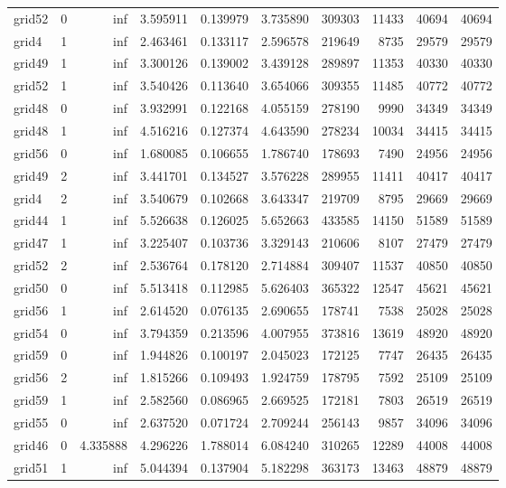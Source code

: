 \begin{longtable}{|l|r|r|r|r|r|r|r|r|r|}
grid52 & 0 & inf & 3.595911 & 0.139979 & 3.735890 & 309303 & 11433 & 40694 & 40694 \\
grid4 & 1 & inf & 2.463461 & 0.133117 & 2.596578 & 219649 & 8735 & 29579 & 29579 \\
grid49 & 1 & inf & 3.300126 & 0.139002 & 3.439128 & 289897 & 11353 & 40330 & 40330 \\
grid52 & 1 & inf & 3.540426 & 0.113640 & 3.654066 & 309355 & 11485 & 40772 & 40772 \\
grid48 & 0 & inf & 3.932991 & 0.122168 & 4.055159 & 278190 & 9990 & 34349 & 34349 \\
grid48 & 1 & inf & 4.516216 & 0.127374 & 4.643590 & 278234 & 10034 & 34415 & 34415 \\
grid56 & 0 & inf & 1.680085 & 0.106655 & 1.786740 & 178693 & 7490 & 24956 & 24956 \\
grid49 & 2 & inf & 3.441701 & 0.134527 & 3.576228 & 289955 & 11411 & 40417 & 40417 \\
grid4 & 2 & inf & 3.540679 & 0.102668 & 3.643347 & 219709 & 8795 & 29669 & 29669 \\
grid44 & 1 & inf & 5.526638 & 0.126025 & 5.652663 & 433585 & 14150 & 51589 & 51589 \\
grid47 & 1 & inf & 3.225407 & 0.103736 & 3.329143 & 210606 & 8107 & 27479 & 27479 \\
grid52 & 2 & inf & 2.536764 & 0.178120 & 2.714884 & 309407 & 11537 & 40850 & 40850 \\
grid50 & 0 & inf & 5.513418 & 0.112985 & 5.626403 & 365322 & 12547 & 45621 & 45621 \\
grid56 & 1 & inf & 2.614520 & 0.076135 & 2.690655 & 178741 & 7538 & 25028 & 25028 \\
grid54 & 0 & inf & 3.794359 & 0.213596 & 4.007955 & 373816 & 13619 & 48920 & 48920 \\
grid59 & 0 & inf & 1.944826 & 0.100197 & 2.045023 & 172125 & 7747 & 26435 & 26435 \\
grid56 & 2 & inf & 1.815266 & 0.109493 & 1.924759 & 178795 & 7592 & 25109 & 25109 \\
grid59 & 1 & inf & 2.582560 & 0.086965 & 2.669525 & 172181 & 7803 & 26519 & 26519 \\
grid55 & 0 & inf & 2.637520 & 0.071724 & 2.709244 & 256143 & 9857 & 34096 & 34096 \\
grid46 & 0 & 4.335888 & 4.296226 & 1.788014 & 6.084240 & 310265 & 12289 & 44008 & 44008 \\
grid51 & 1 & inf & 5.044394 & 0.137904 & 5.182298 & 363173 & 13463 & 48879 & 48879 \\

\end{longtable}

